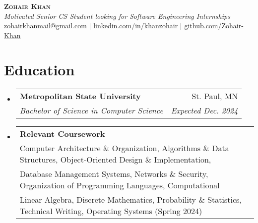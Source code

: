 \documentclass[letterpaper,11pt]{article}
\makeatletter
\newcommand{\resumeSubheading}[4]{
  \vspace{-1pt}\item
    \begin{tabular*}{0.97\textwidth}{l@{\extracolsep{\fill}}r}
      \textbf{#1} & #2 \vspace{-2pt}\\
      \textit{\small#3} & \textit{\small #4} \\
    \end{tabular*}\vspace{-8pt}
}
\newcommand{\resumeCoursework}[4]{
  \vspace{-1pt}\item
    \begin{tabular*}{0.97\textwidth}{l@{\extracolsep{\fill}}r}
      \textbf{#1} \vspace{-2pt}\\
      {\small#2} \\
      {\small #3} \\
      {\small #4} \\
    \end{tabular*}\vspace{-5pt}
}
\newcommand{\resumeSubHeadingListStart}{\begin{itemize}[leftmargin=*]}
\newcommand{\resumeSubHeadingListEnd}{\end{itemize}}
\makeatother
\begin{document}
  

\begin{center}
    \textbf{\Huge \scshape Zohair Khan} \\ \vspace{1pt}
    \textit {Motivated Senior CS Student looking for Software Engineering Internships} \\
    \href{mailto:zohairkhanmail@gmail.com}{\underline{zohairkhanmail@gmail.com}} $|$ 
    \href{https://www.linkedin.com/in/khanzohair/}{\underline{linkedin.com/in/khanzohair}} $|$
    \href{https://github.com/Zohair-Khan}{\underline{github.com/Zohair-Khan}} 
\end{center} 
\vspace{-21pt}


\section{Education}
  \resumeSubHeadingListStart
    \resumeSubheading
      {Metropolitan State University}{St. Paul, MN}
      {Bachelor of Science in Computer Science}{Expected Dec. 2024} \vspace{-5pt}
    \resumeCoursework
      {Relevant Coursework}
      {Computer Architecture \& Organization, Algorithms \& Data Structures, Object-Oriented Design \& Implementation,}
      {Database Management Systems, Networks \& Security, Organization of Programming Languages, Computational }
      {Linear Algebra, Discrete Mathematics, Probability \& Statistics, Technical Writing, Operating Systems (Spring 2024)}
  \resumeSubHeadingListEnd \vspace{-15pt}

\end{document}
